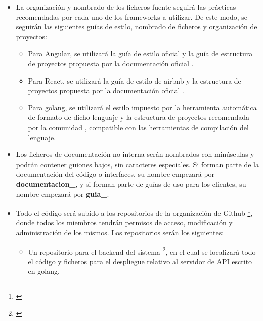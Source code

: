 \documentclass[12pt, a4paper, titlepage]{article}
\begin{document}
\begin{itemize}
    \item La organización y nombrado de los ficheros fuente seguirá las prácticas recomendadas por cada uno de los frameworks a utilizar. De este modo, se seguirán las siguientes guías de estilo, nombrado de ficheros y organización de proyectos:
    \begin{itemize}
        \item Para Angular, se utilizará la guía de estilo oficial \cite{estiloangular} y la guía de estructura de proyectos propuesta por la documentación oficial \cite{estructuraangular}.
        
        \item Para React, se utilizará la
        guía de estilo de airbnb \cite{estiloreact} y la estructura de proyectos propuesta por la documentación oficial \cite{estructurareact}.
        
        \item Para golang, se utilizará el estilo impuesto por la herramienta automática de formato de dicho lenguaje \cite{estilogolang} y la estructura de proyectos recomendada por la comunidad \cite{estructuragolang}, compatible con las herramientas de compilación del lenguaje.
    \end{itemize}
    
    \item Los ficheros de documentación no interna serán nombrados con minúsculas y podrán contener guiones bajos, sin caracteres especiales. Si forman parte de la documentación del código o interfaces, su nombre empezará por \textbf{documentacion\_}, y si forman parte de guías de uso para los clientes, su nombre empezará por \textbf{guia\_}.
    
    \item Todo el código será subido a los repositorios de la organización de Github \footnote{\href{https://github.com/UNIZAR-30226-2022-01}{\color{blue}{Repositorio de la organización de Github}}}, donde todos los miembros tendrán permisos de acceso, modificación y administración de los mismos. Los repositorios serán los siguientes:
    \begin{itemize}
        \item Un repositorio para el backend del sistema \footnote{\href{https://github.com/UNIZAR-30226-2022-01/proyecto_software_backend}{\color{blue}{Repositorio del backend del sistema}}}, en el cual se localizará todo el código y ficheros para el despliegue relativo al servidor de API escrito en golang.
        

\end{itemize}
\end{itemize}
\end{document}
